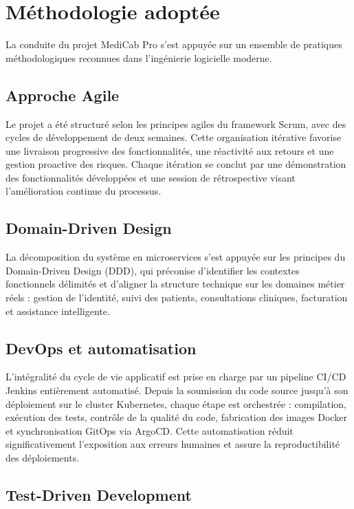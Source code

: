 \section{Méthodologie adoptée}

La conduite du projet MediCab Pro s'est appuyée sur un ensemble de pratiques
méthodologiques reconnues dans l'ingénierie logicielle moderne.

\subsection{Approche Agile}

Le projet a été structuré selon les principes agiles du framework Scrum,
avec des cycles de développement de deux semaines. Cette organisation itérative
favorise une livraison progressive des fonctionnalités, une réactivité aux
retours et une gestion proactive des risques. Chaque itération se conclut
par une démonstration des fonctionnalités développées et une session de
rétrospective visant l'amélioration continue du processus.

\subsection{Domain-Driven Design}

La décomposition du système en microservices s'est appuyée sur les principes
du Domain-Driven Design (DDD), qui préconise d'identifier les contextes
fonctionnels délimités et d'aligner la structure technique sur les domaines
métier réels : gestion de l'identité, suivi des patients, consultations cliniques,
facturation et assistance intelligente.

\subsection{DevOps et automatisation}

L'intégralité du cycle de vie applicatif est prise en charge par un pipeline
CI/CD Jenkins entièrement automatisé. Depuis la soumission du code source jusqu'à
son déploiement sur le cluster Kubernetes, chaque étape est orchestrée : compilation,
exécution des tests, contrôle de la qualité du code, fabrication des images Docker
et synchronisation GitOps via ArgoCD. Cette automatisation réduit significativement
l'exposition aux erreurs humaines et assure la reproductibilité des déploiements.

\subsection{Test-Driven Development}

